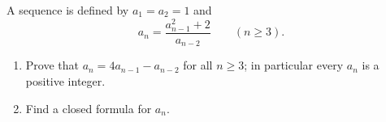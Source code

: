 A sequence is defined by $a_1=a_2=1$ and
\[a_n=\dfrac{a_{n-1}^2+2}{a_{n-2}}\qquad(n\ge3).\]
\begin{enumerate}
\item[(a)] Prove that $a_n=4a_{n-1}-a_{n-2}$ for all $n\ge3$; in particular every $a_n$ is a positive integer.
\item[(b)] Find a closed formula for $a_n$.
\end{enumerate}
